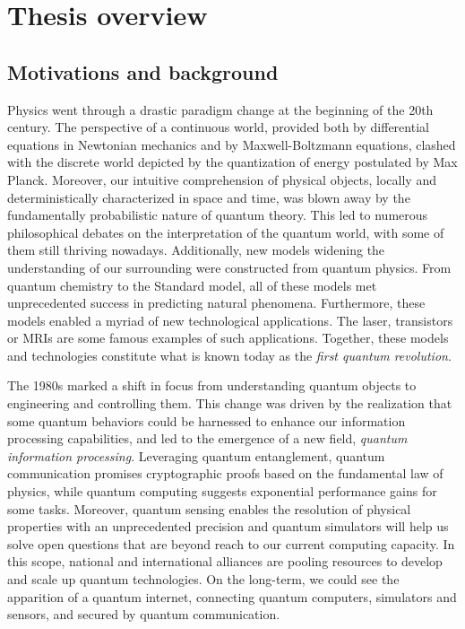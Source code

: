 \chapter{Thesis overview}

\section{Motivations and background}

Physics went through a drastic paradigm change at the beginning of the 20th century.
The perspective of a continuous world, provided both by differential equations in Newtonian mechanics and by Maxwell-Boltzmann equations, clashed with the discrete world depicted by the quantization of energy postulated by Max Planck.
Moreover, our intuitive comprehension of physical objects, locally and deterministically characterized in space and time, was blown away by the fundamentally probabilistic nature of quantum theory.
This led to numerous philosophical debates on the interpretation of the quantum world, with some of them still thriving nowadays.
Additionally, new models widening the understanding of our surrounding were constructed from quantum physics.
From quantum chemistry to the Standard model, all of these models met unprecedented success in predicting natural phenomena.
Furthermore, these models enabled a myriad of new technological applications.
The laser, transistors or MRIs are some famous examples of such applications.
Together, these models and technologies constitute what is known today as the \textit{first quantum revolution}.

\medbreak

The 1980s marked a shift in focus from understanding quantum objects to engineering and controlling them.
This change was driven by the realization that some quantum behaviors could be harnessed to enhance our information processing capabilities, and led to the emergence of a new field, \textit{quantum information processing}.
Leveraging quantum entanglement, quantum communication promises cryptographic proofs based on the fundamental law of physics, while quantum computing suggests exponential performance gains for some tasks.
Moreover, quantum sensing enables the resolution of physical properties with an unprecedented precision and quantum simulators will help us solve open questions that are beyond reach to our current computing capacity. 
In this scope, national and international alliances are pooling resources to develop and scale up quantum technologies.
On the long-term, we could see the apparition of a quantum internet, connecting quantum computers, simulators and sensors, and secured by quantum communication.

